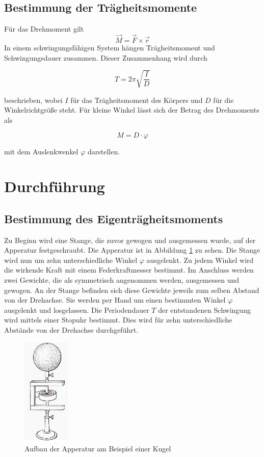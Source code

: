 \documentclass[
  bibliography=totoc,     %
  captions=tableheading,  %
  titlepage=firstiscover, %
]{scrartcl}
\begin{document}
\subsection{Bestimmung der Trägheitsmomente}
Für das Drehmoment gilt
\begin{equation}
  \vec{M} = \vec{F} \times \vec{r}
  \label{eqn:6}
\end{equation}
In einem schwingungsfähigen System hängen Trägheitsmoment und Schwingungsdauer zusammen.
Dieser Zusammenhang wird durch

\begin{equation}
  T = 2\pi \sqrt{\frac{I}{D}}
  \label{eqn:7}
\end{equation}

beschrieben, wobei $I$ für das Trägheitsmoment des Körpers und $D$ für die
Winkelrichtgröße steht.
Für kleine Winkel lässt sich der Betrag des Drehmoments als

\begin{equation}
  M = D \cdot\varphi
  \label{eqn:8}
\end{equation}

mit dem Auslenkwenkel $\varphi$ darstellen.

\section{Durchführung}
\label{sec.Durchführung}

   \subsection{Bestimmung des Eigenträgheitsmoments}

   Zu Beginn wird eine Stange,
   die zuvor gewogen und ausgemessen wurde,
   auf der Apperatur festgeschraubt.
   Die Apperatur ist in Abbildung \ref{fig:1} zu sehen.
   Die Stange wird nun um zehn unterschiedliche Winkel $\varphi$ ausgelenkt.
   Zu jedem Winkel wird die wirkende Kraft mit einem Federkraftmesser bestimmt.
   Im Anschluss werden zwei Gewichte, die als symmetrisch angenommen werden,
   ausgemessen und gewogen.
   An der Stange befinden sich diese Gewichte jeweils zum selben Abstand von der Drehachse.
   Sie werden per Hand um einen bestimmten Winkel $\varphi$ ausgelenkt und losgelassen.
   Die Periodendauer $T$ der entstandenen Schwingung wird mittels einer Stopuhr bestimmt.
   Dies wird für zehn unterschiedliche Abstände von der Drehachse durchgeführt.

   \begin{figure}
    \centering
    \includegraphics[scale=0.8]{V101_Aufbau.png}
    \caption{Aufbau der Apperatur am Beispiel einer Kugel}
    \label{fig:1}
   \end{figure}
\end{document}
